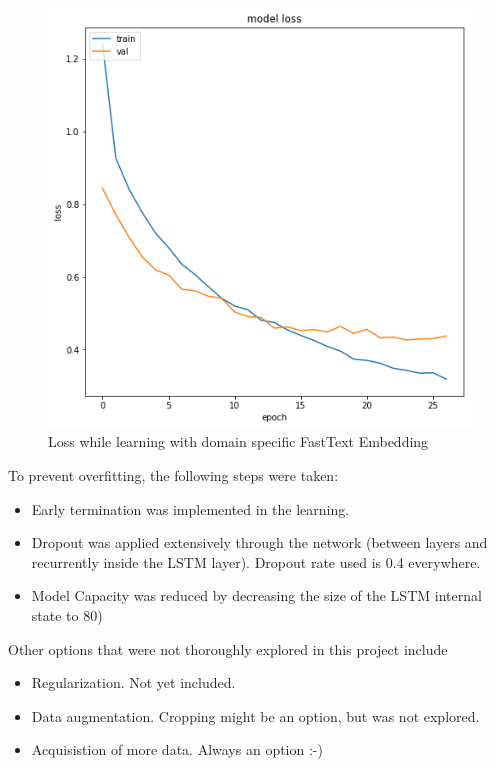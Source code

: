 \documentclass[10pt,a4paper]{article}
\begin{document}
	\begin{figure}
		\begin{center}
			\includegraphics[scale=0.4]{./Pictures/loss_ds_ft.png}
			
			\caption{Loss while learning with domain specific FastText Embedding}
			\label{loss}
		\end{center}
	\end{figure}
	
	
	To prevent overfitting, the following steps were taken:
	\begin{itemize}
		\item Early termination was implemented in the learning. 
		\item Dropout was applied extensively through the network (between layers and recurrently inside the LSTM layer). Dropout rate used is 0.4 everywhere.
		\item Model Capacity was reduced by decreasing the size of the LSTM internal state to 80)
	\end{itemize}
    Other options that were not thoroughly explored in this project include
	\begin{itemize}
		\item Regularization. Not yet included.
		\item Data augmentation. Cropping might be an option, but was not explored.
		\item Acquisistion of more data. Always an option :-)
	\end{itemize}
\end{document}
